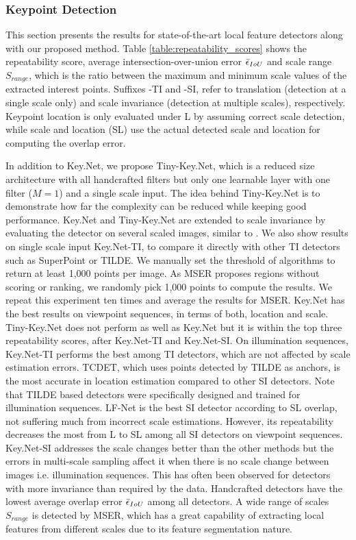 \subsubsection{Keypoint Detection}

This section presents the results for state-of-the-art local feature detectors along with our proposed method. Table \ref{table:repeatability_scores} shows the repeatability score,  average intersection-over-union error $\Bar{\epsilon}_{IoU}$ and scale range $S_{range}$, which is the ratio between the maximum and minimum scale values of the extracted interest points.  Suffixes -TI and -SI, refer to translation (detection at a single scale only) and scale invariance (detection at multiple scales), respectively. Keypoint location is only evaluated under L by assuming correct scale detection, while scale and location (SL) use the actual detected scale and location for computing the overlap error. \par
In addition to Key.Net, we propose Tiny-Key.Net, which is a reduced size architecture with all handcrafted filters but only one learnable layer with one filter  ($M = 1$) and a single scale input. The idea behind Tiny-Key.Net is to demonstrate how far the complexity can be reduced while keeping good performance. Key.Net and Tiny-Key.Net are extended to scale invariance by evaluating the detector on several scaled images, similar to \cite{Zhang_Felix_CVPR_17}. We also show results on single scale input Key.Net-TI, to compare it directly with other TI detectors such as SuperPoint or TILDE. We manually set the threshold of algorithms to return at least 1,000 points per image. As MSER proposes regions without scoring or ranking, we randomly pick 1,000 points to compute the results. We repeat this experiment ten times and average the results for MSER. Key.Net has the best results on viewpoint sequences, in terms of both, location and scale. Tiny-Key.Net does not perform as well as Key.Net but it is within the top three repeatability scores, after Key.Net-TI and Key.Net-SI. \newline
On illumination sequences, Key.Net-TI performs the best among TI detectors, which are not affected by scale estimation errors. TCDET, which uses points detected by TILDE as anchors, is the most accurate in location estimation compared to other SI detectors. Note that TILDE based detectors were specifically designed and trained for illumination sequences. LF-Net is the best SI detector according to SL overlap, not suffering much from incorrect scale estimations. However, its repeatability decreases the most from L to SL among all SI detectors on viewpoint sequences. Key.Net-SI addresses the scale changes better than the other methods but the errors in multi-scale sampling affect it when there is no scale change between images i.e. illumination sequences. This has often been observed for detectors with more invariance than required by the data. Handcrafted detectors have the lowest average overlap error $\Bar{\epsilon}_{IoU}$ among all detectors. A wide range of scales $S_{range}$ is detected by MSER, which has a great capability of extracting local features from different scales due to its feature segmentation nature. 

